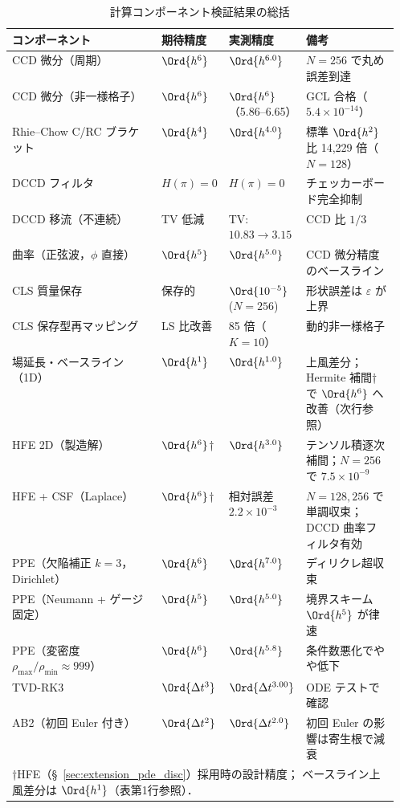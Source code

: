 \begin{table}[htbp]
\centering
\caption{計算コンポーネント検証結果の総括}
\label{tab:verification_summary}
\renewcommand{\arraystretch}{1.3}
\small
\begin{tabular}{lp{0.14\linewidth}p{0.18\linewidth}p{0.24\linewidth}}
\toprule
コンポーネント & 期待精度 & 実測精度 & 備考 \\
\midrule
CCD 微分（周期） & $\Ord{h^6}$ & $\Ord{h^{6.0}}$ & $N = 256$ で丸め誤差到達 \\
CCD 微分（非一様格子） & $\Ord{h^6}$ & $\Ord{h^6}$（5.86--6.65） & GCL 合格（$5.4 \times 10^{-14}$） \\
Rhie--Chow C/RC ブラケット & $\Ord{h^4}$ & $\Ord{h^{4.0}}$ & 標準 $\Ord{h^2}$ 比 14{,}229 倍（$N{=}128$） \\
DCCD フィルタ   & $H(\pi) = 0$ & $H(\pi) = 0$ & チェッカーボード完全抑制 \\
DCCD 移流（不連続） & TV 低減 & TV: $10.83 \to 3.15$ & CCD 比 $1/3$ \\
曲率（正弦波，$\phi$ 直接） & $\Ord{h^5}$ & $\Ord{h^{5.0}}$ & CCD 微分精度のベースライン \\
CLS 質量保存    & 保存的     & $\Ord{10^{-5}}$ ($N=256$) & 形状誤差は $\varepsilon$ が上界 \\
CLS 保存型再マッピング & LS 比改善 & 85 倍（$K=10$） & 動的非一様格子 \\
場延長・ベースライン（1D）& $\Ord{h^1}$ & $\Ord{h^{1.0}}$ & 上風差分；Hermite 補間†で $\Ord{h^6}$ へ改善（次行参照） \\
HFE 2D（製造解） & $\Ord{h^6}$† & $\Ord{h^{3.0}}$ & テンソル積逐次補間；$N{=}256$ で $7.5 \times 10^{-9}$ \\
HFE + CSF（Laplace） & $\Ord{h^6}$† & 相対誤差 $2.2\times10^{-3}$ & $N{=}128{,}256$ で単調収束；DCCD 曲率フィルタ有効 \\
PPE（欠陥補正 $k{=}3$，Dirichlet） & $\Ord{h^6}$ & $\Ord{h^{7.0}}$ & ディリクレ超収束 \\
PPE（Neumann + ゲージ固定） & $\Ord{h^5}$ & $\Ord{h^{5.0}}$ & 境界スキーム $\Ord{h^5}$ が律速 \\
PPE（変密度 $\rho_{\max}/\rho_{\min}{\approx}999$） & $\Ord{h^6}$ & $\Ord{h^{5.8}}$ & 条件数悪化でやや低下 \\
TVD-RK3         & $\Ord{\Delta t^3}$ & $\Ord{\Delta t^{3.00}}$ & ODE テストで確認 \\
AB2（初回 Euler 付き） & $\Ord{\Delta t^2}$ & $\Ord{\Delta t^{2.0}}$ & 初回 Euler の影響は寄生根で減衰 \\
\bottomrule
\multicolumn{4}{l}{\footnotesize †HFE（§~\ref{sec:extension_pde_disc}）採用時の設計精度；
  ベースライン上風差分は $\Ord{h^1}$（表第1行参照）．} \\
\end{tabular}
\end{table}

